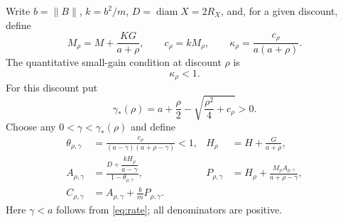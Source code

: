 \documentclass[11pt,a4paper]{article}
\newcommand{\diam}{\operatorname{diam}}
\begin{document}
Write $b=\|B\|$, $k=b^2/m$, $D=\diam X=2R_X$, and, for a given discount,
define
\begin{equation}\label{eq:smallgain}
 M_\rho=M+\frac{KG}{a+\rho},\qquad
 c_\rho=kM_\rho,\qquad
 \kappa_\rho=\frac{c_\rho}{a(a+\rho)}.
\end{equation}
The quantitative small-gain condition at discount $\rho$ is
\begin{equation}\label{eq:sgcondition}
 \kappa_\rho<1.
\end{equation}
For this discount put
\begin{equation}\label{eq:rate}
 \gamma_*(\rho)=a+\frac\rho2-
                 \sqrt{\frac{\rho^2}{4}+c_\rho}>0.
\end{equation}
Choose any $0<\gamma<\gamma_*(\rho)$ and define
\begin{align}
 \theta_{\rho,\gamma}
   &=\frac{c_\rho}{(a-\gamma)(a+\rho-\gamma)}<1,
       & H_\rho&=H+\frac G{a+\rho},\label{eq:theta}\\
 A_{\rho,\gamma}
   &=\frac{D+\dfrac{kH_\rho}{a-\gamma}}
           {1-\theta_{\rho,\gamma}},
       & P_{\rho,\gamma}
   &=H_\rho+\frac{M_\rho A_{\rho,\gamma}}{a+\rho-\gamma},\label{eq:AP}\\
 C_{\rho,\gamma}&=A_{\rho,\gamma}+\frac bmP_{\rho,\gamma}.
 \label{eq:C}
\end{align}
Here $\gamma<a$ follows from \eqref{eq:rate}; all denominators are positive.
\end{document}
